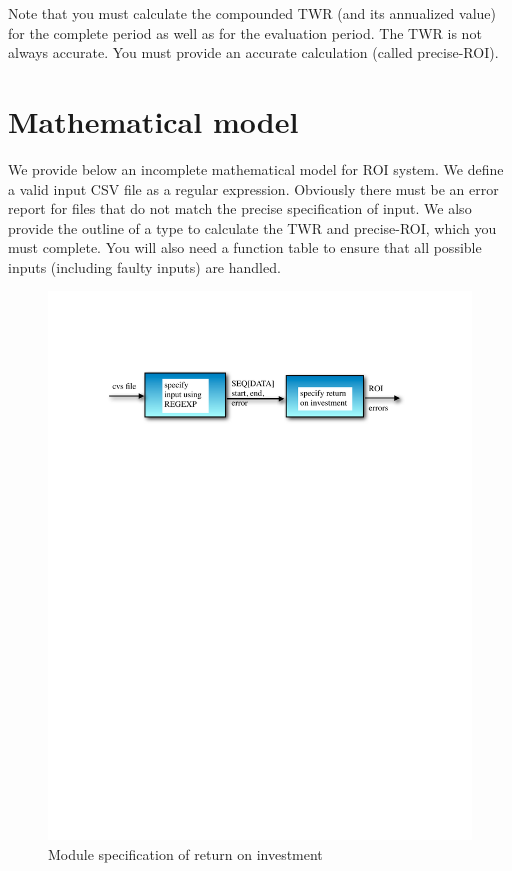 \documentclass[runningheads,12pt]{article}
\begin{document}
{\color{red} Note that you must calculate the compounded TWR (and its annualized value) for the complete period as well as for the evaluation period. The TWR is not always accurate. You must provide an accurate calculation (called precise-ROI).}

\section{Mathematical model}

{\color{red} We provide below an incomplete mathematical model for ROI system. We define a valid input CSV file as a regular expression. Obviously there must be an error report for files that do not match the precise specification of input. We also provide the outline of a type to calculate the TWR and precise-ROI, which you must complete. You will also need a function table to ensure that all possible inputs (including faulty inputs) are handled.}

\begin{figure}
\centering
\includegraphics[scale=0.8]{inputs/spec.pdf}

\caption{Module specification of return on investment}
\end{figure}
\end{document}
